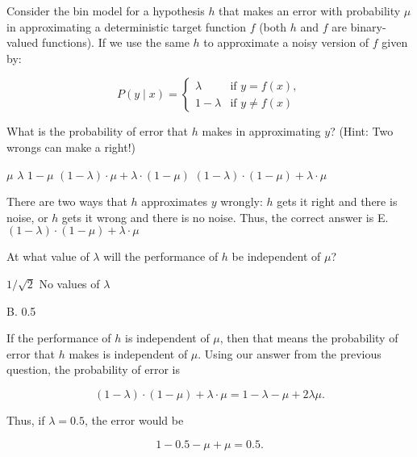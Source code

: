 \documentclass[answers]{exam}
\begin{document}
Consider the bin model for a hypothesis $h$ that makes an error with probability 
$\mu$ in approximating a deterministic target function $f$ (both $h$ and $f$ are 
binary-valued functions). If we use the same $h$ to approximate a noisy version of 
$f$ given by:

\[
P(y \mid x) = 
\begin{cases} 
    \lambda & \text{if } y = f(x), \\
    1 - \lambda & \text{if } y \neq f(x)
\end{cases}
\]

\begin{questions}
\setcounter{question}{2}

\question What is the probability of error that $h$ makes in approximating $y$? 
(Hint: Two wrongs can make a right!)
\begin{choices}
    \choice $\mu$
    \choice $\lambda$
    \choice $1 - \mu$
    \choice $(1 - \lambda) \cdot \mu + \lambda \cdot (1 - \mu)$
    \choice $(1 - \lambda) \cdot (1 - \mu) + \lambda \cdot \mu$
\end{choices}

\begin{solution}
    There are two ways that $h$ approximates $y$ wrongly: $h$ gets it right
    and there is noise, or $h$ gets it wrong and there is no noise. Thus,
    the correct answer is E. $(1 - \lambda) \cdot (1 - \mu) + \lambda \cdot \mu$
\end{solution}

\question At what value of $\lambda$ will the performance of $h$ be independent of 
$\mu$?
\begin{choices}
    \choice $1/\sqrt{2}$
    \choice No values of $\lambda$
\end{choices}

\begin{solution}
    B. 0.5
    
    If the performance of $h$ is independent of $\mu$, then that means the 
    probability of error that $h$ makes is independent of $\mu$. Using our 
    answer from the previous question, the probability of error is

    \[
        (1 - \lambda) \cdot (1 - \mu) + \lambda \cdot \mu = 1 - \lambda - \mu + 2\lambda\mu 
    .\] 

    Thus, if $\lambda=0.5$, the error would be

    \[
    1 - 0.5 - \mu + \mu = 0.5
    .\] 
\end{solution}

\end{questions}
\end{document}
